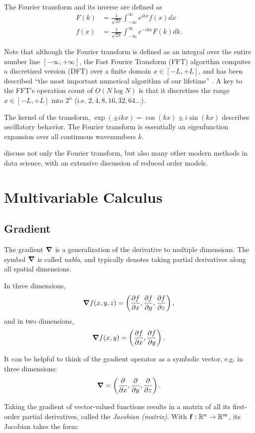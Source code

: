 The Fourier transform and its inverse are defined as
\begin{align*}
    F(k) &= \frac{1}{\sqrt{2\pi}}\int_{-\infty}^{\infty}e^{ikx}f(x)dx \\
    f(x) &= \frac{1}{\sqrt{2\pi}}\int_{-\infty}^{\infty}e^{-ikx}F(k)dk.
\end{align*}

Note that although the Fourier transform is defined as an integral over the
entire number line $[-\infty, +\infty]$, the Fast Fourier Transform (FFT)
algorithm computes a discretized version (DFT) over a finite domain $x \in [-L,
+L]$, and has been described ``the most important numerical algorithm of our
lifetime'' \citep{fft-important}. A key to the FFT's operation count of $O(N
\log N)$ is that it discretizes the range $x \in [-L, +L]$ into $2^n$ (i.e.
$2,4,8,16,32,64\dots$).

The kernel of the transform, $\exp(\pm ikx) = \cos(kx) \pm i\sin(kx)$ describes
oscillatory behavior. The Fourier transform is essentially an eigenfunction
expansion over all continuous wavenumbers $k$.

\cite{BruntonKnutz2019} discuss not only the Fourier transform, but also many
other modern methods in data science, with an extensive discussion of reduced
order models.

\section{Multivariable Calculus}
\subsection*{Gradient}
The gradient $\grad$ is a generalization of the derivative to multiple
dimensions. The symbol $\grad$ is called \textit{nabla}, and typically denotes
taking partial derivatives along all spatial dimensions. 

In three dimensions, 
$$\grad f(x,y,z) = \left(\pdv{f}{x}, \pdv{f}{y}, \pdv{f}{z}\right),$$ 
and in two dimensions,
$$\grad f(x,y) = \left(\pdv{f}{x}, \pdv{f}{y}\right).$$

It can be helpful to think of the gradient operator as a symbolic
vector, e.g. in three dimensions:
$$\grad = \left(\pdv{x}, \pdv{y}, \pdv{z}\right).$$ 

Taking the gradient of vector-valued functions results in a matrix of all its
first-order partial derivatives, called the \textit{Jacobian (matrix)}. With
$\vb{f}: \mathbb{R}^n \to \mathbb{R}^m$, its Jacobian takes the form:

